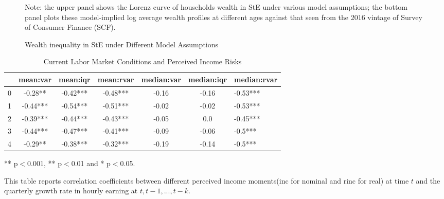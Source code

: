 \begin{figure}[!ht]
	\caption{Wealth inequality in StE under Different Model Assumptions}
	\label{fig:StE_dist_compare}
	\begin{center}
\end{center}
\begin{flushleft}Note: the upper panel shows the Lorenz curve of households wealth in StE under various model assumptions; the bottom panel plots these model-implied log average wealth profiles at different ages against that seen from the 2016 vintage of Survey of Consumer Finance (SCF). \end{flushleft}
\end{figure}


\clearpage

\begin{table}[ht]
\centering
\begin{adjustbox}{width={\textwidth}}
\begin{threeparttable}
\caption{Current Labor Market Conditions and Perceived Income Risks}
\label{macro_corr_he}
\begin{tabular}{ccccccl}
\toprule
{} &  mean:var &  mean:iqr & mean:rvar & median:var & median:iqr & median:rvar \\
\midrule
0 &   -0.28** &  -0.42*** &  -0.48*** &      -0.16 &      -0.16 &    -0.53*** \\
1 &  -0.44*** &  -0.54*** &  -0.51*** &      -0.02 &      -0.02 &    -0.53*** \\
2 &  -0.39*** &  -0.44*** &  -0.43*** &      -0.05 &        0.0 &    -0.45*** \\
3 &  -0.44*** &  -0.47*** &  -0.41*** &      -0.09 &      -0.06 &     -0.5*** \\
4 &   -0.29** &  -0.38*** &  -0.32*** &      -0.19 &      -0.14 &     -0.5*** \\
\bottomrule
\end{tabular}
\begin{flushleft}
\item *** p$<$0.001, ** p$<$0.01 and * p$<$0.05.
\item This table reports correlation coefficients between different perceived income moments(inc for nominal
and rinc for real) at time
$t$ and the quarterly growth rate in hourly earning at $t,t-1,...,t-k$.
\end{flushleft}
\end{threeparttable}
\end{adjustbox}
\end{table}
\clearpage

